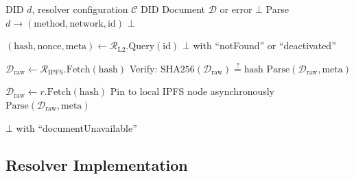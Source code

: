 \documentclass[11pt,a4paper]{article}
\begin{document}
\begin{algorithm}[H]
\caption{Three-Layer DID Resolution}
\label{alg:resolution}
\begin{algorithmic}[1]
\Require DID $d$, resolver configuration $\mathcal{C}$
\Ensure DID Document $\mathcal{D}$ or error $\bot$
    \State Parse $d \to (\text{method}, \text{network}, \text{id})$
     \Return $\bot$ \EndIf

    \State {}
    \State $(\text{hash}, \text{nonce}, \text{meta}) \gets \mathcal{R}_{\text{L2}}.\text{Query}(\text{id})$
        \Return $\bot$ with ``notFound'' or ``deactivated''
    \EndIf

    \State {}
    \State $\mathcal{D}_{\text{raw}} \gets \mathcal{R}_{\text{IPFS}}.\text{Fetch}(\text{hash})$
        \State Verify: $\text{SHA256}(\mathcal{D}_{\text{raw}}) \stackrel{?}{=} \text{hash}$
         \Return $\text{Parse}(\mathcal{D}_{\text{raw}}, \text{meta})$ \EndIf
    \EndIf

    \State {}
        \State $\mathcal{D}_{\text{raw}} \gets r.\text{Fetch}(\text{hash})$
            \State Pin to local IPFS node asynchronously
            \Return $\text{Parse}(\mathcal{D}_{\text{raw}}, \text{meta})$
        \EndIf
    \EndFor

    \Return $\bot$ with ``documentUnavailable''
\EndFunction
\end{algorithmic}
\end{algorithm}

\subsection{Resolver Implementation}
\end{document}
